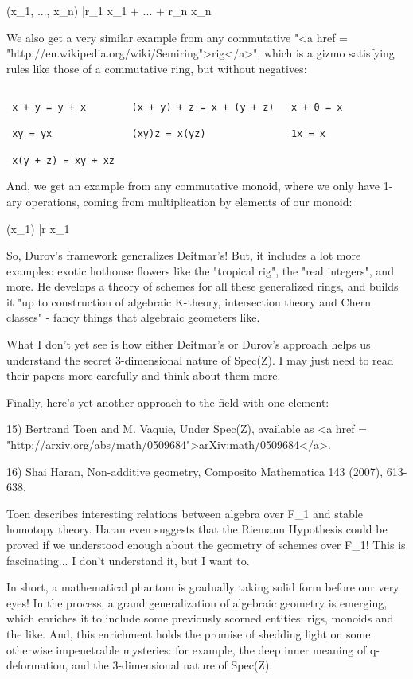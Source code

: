 (x_{1}, ..., x_{n}) |\to  r_{1} x_{1} + 
... + r_{n} x_{n}           

We also get a very similar example from any commutative "<a href =
"http://en.wikipedia.org/wiki/Semiring">rig</a>",
which is a gizmo satisfying rules like those of a commutative ring,
but without negatives:


\begin{verbatim}

 x + y = y + x        (x + y) + z = x + (y + z)   x + 0 = x

 xy = yx              (xy)z = x(yz)               1x = x

 x(y + z) = xy + xz 
\end{verbatim}
    

And, we get an example from any commutative monoid, where we only
have 1-ary operations, coming from multiplication by elements of
our monoid:

(x_{1}) |\to  r x_{1}

So, Durov's framework generalizes Deitmar's!  But, it includes a lot
more examples: exotic hothouse flowers like the "tropical rig", the
"real integers", and more.  He develops a theory of schemes for all
these generalized rings, and builds it "up to construction of algebraic 
K-theory, intersection theory and Chern classes" - fancy things that
algebraic geometers like.

What I don't yet see is how either Deitmar's or Durov's approach
helps us understand the secret 3-dimensional nature of Spec(Z).  
I may just need to read their papers more carefully and think about
them more.

Finally, here's yet another approach to the field with one element:

15) Bertrand Toen and M. Vaquie, Under Spec(Z), available as 
<a href = "http://arxiv.org/abs/math/0509684">arXiv:math/0509684</a>.

16) Shai Haran, Non-additive geometry, Composito Mathematica 143
(2007), 613-638.  

Toen describes interesting relations between algebra over F_{1} and
stable homotopy theory.  Haran even suggests that the Riemann
Hypothesis could be proved if we understood enough about the geometry
of schemes over F_{1}!  This is fascinating... I don't understand it,
but I want to.

In short, a mathematical phantom is gradually taking solid form before our
very eyes!   In the process, a grand generalization of algebraic geometry
is emerging, which enriches it to include some previously scorned 
entities: rigs, monoids and the like.  And, this enrichment 
holds the promise of shedding light on some otherwise impenetrable
mysteries: for example, the deep inner meaning of 
q-deformation, and the 3-dimensional nature of Spec(Z).


